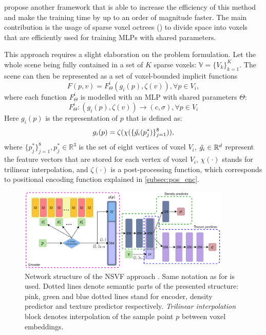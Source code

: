 \cite{liu2021neural} propose another framework
that is able to increase the efficiency of this method
and make the training time by up to an order of magnitude faster.
The main contribution is the usage of sparse voxel octrees (\cite{laine2011EfficientSV}) to divide space into voxels
that are efficiently used for training MLPs with shared parameters.

This approach requires a slight elaboration on the problem formulation.
Let the whole scene being fully contained in a set of $K$ sparse voxels: $\mathbb{V} = \{V_k\}_{k=1}^K$.
The scene can then be represented as a set of voxel-bounded implicit functions
\begin{equation}
    F(p, v) = F_\Theta^i(g_i(p), \zeta(v)), \forall p \in V_i,
\end{equation}
where each function $F_\Theta^i$ is modelled with an MLP with shared parameters $\Theta$:
\begin{equation}
    F_\Theta^i: (g_i(p), \zeta(v)) \xrightarrow{} (c, \sigma), \forall p \in V_i
\end{equation}
Here $g_i(p)$ is the representation of $p$ that is defined as:
\begin{equation}
    g_i(p) = \zeta ( \chi ( \{\Tilde{g_i}(p_j^*)\}_{j=1}^8 ) ),
\end{equation}
where $\{p_j^*\}_{j=1}^8, p_j^* \in \mathbb{R}^3$ is the set of eight vertices of voxel $V_i$,
$\Tilde{g_i} \in \mathbb{R}^d$ represent the feature vectors that are stored for each vertex of voxel $V_i$,
$\chi(\cdot)$ stands for trilinear interpolation,
and $\zeta(\cdot)$ is a post-processing function,
which corresponds to positional encoding function explained in \ref{subsec:pos_enc}.


\begin{figure}[t]
    \label{fig:nsvf_structure}
    \centering
    \includegraphics[width=0.9\textwidth]{figures/vanilla_nsvf.png}
    \caption{Network structure of the NSVF approach \cite{liu2021neural}.
Same notation as for  is used.
Dotted lines denote semantic parts of the presented structure:
pink, green and blue dotted lines stand for encoder, density predictor and texture predictor respectively.
\textit{Trilinear interpolation} block denotes interpolation of the sample point $p$ between voxel embeddings.}
\end{figure}

